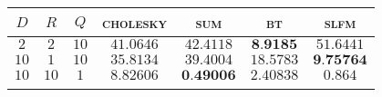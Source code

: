 
\begin{tabular}{|ccc|cccc|}
  \hline
  \abovespace\belowspace
  $D$ & $R$ & $Q$ & \textsc{cholesky} & \textsc{sum} & \textsc{bt} & \textsc{slfm}\\
\hline
  \abovespace
 $ 2 $ & $ 2 $ & $ 10 $ & $ 41.0646 $ & $ 42.4118 $ & $ \textbf{8.9185} $ & $ 51.6441 $ \\ 
 $ 10 $ & $ 1 $ & $ 10 $ & $ 35.8134 $ & $ 39.4004 $ & $ 18.5783 $ & $ \textbf{9.75764} $ \\ 
 $ 10 $ & $ 10 $ & $ 1 $ & $ 8.82606 $ & $ \textbf{0.49006} $ & $ 2.40838 $ & $ 0.864 $ \\ 

  \belowspace \\

  \hline
\end{tabular}
